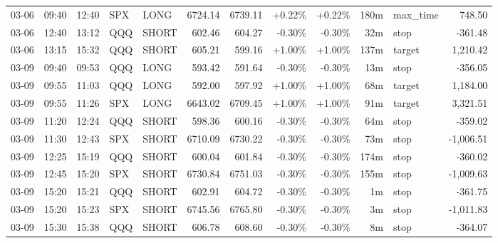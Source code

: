 \documentclass[11pt,a4paper,twoside]{article}
\begin{document}
\begin{center}
\begin{longtable}{>{\color{txtmain}}l l l l l r r r r r >{\color{txtmain}}l r}
03-06 & 09:40 & 12:40 & SPX & LONG & 6724.14 & 6739.11 & \textcolor{wingreen}{+0.22\%} & \textcolor{wingreen}{+0.22\%} & 180m & max\_time & \textcolor{wingreen}{748.50} \\
03-06 & 12:40 & 13:12 & QQQ & SHORT & 602.46 & 604.27 & \textcolor{lossred}{-0.30\%} & \textcolor{lossred}{-0.30\%} & 32m & stop & \textcolor{lossred}{-361.48} \\
03-06 & 13:15 & 15:32 & QQQ & SHORT & 605.21 & 599.16 & \textcolor{wingreen}{+1.00\%} & \textcolor{wingreen}{+1.00\%} & 137m & target & \textcolor{wingreen}{1,210.42} \\
03-09 & 09:40 & 09:53 & QQQ & LONG & 593.42 & 591.64 & \textcolor{lossred}{-0.30\%} & \textcolor{lossred}{-0.30\%} & 13m & stop & \textcolor{lossred}{-356.05} \\
03-09 & 09:55 & 11:03 & QQQ & LONG & 592.00 & 597.92 & \textcolor{wingreen}{+1.00\%} & \textcolor{wingreen}{+1.00\%} & 68m & target & \textcolor{wingreen}{1,184.00} \\
03-09 & 09:55 & 11:26 & SPX & LONG & 6643.02 & 6709.45 & \textcolor{wingreen}{+1.00\%} & \textcolor{wingreen}{+1.00\%} & 91m & target & \textcolor{wingreen}{3,321.51} \\
03-09 & 11:20 & 12:24 & QQQ & SHORT & 598.36 & 600.16 & \textcolor{lossred}{-0.30\%} & \textcolor{lossred}{-0.30\%} & 64m & stop & \textcolor{lossred}{-359.02} \\
03-09 & 11:30 & 12:43 & SPX & SHORT & 6710.09 & 6730.22 & \textcolor{lossred}{-0.30\%} & \textcolor{lossred}{-0.30\%} & 73m & stop & \textcolor{lossred}{-1,006.51} \\
03-09 & 12:25 & 15:19 & QQQ & SHORT & 600.04 & 601.84 & \textcolor{lossred}{-0.30\%} & \textcolor{lossred}{-0.30\%} & 174m & stop & \textcolor{lossred}{-360.02} \\
03-09 & 12:45 & 15:20 & SPX & SHORT & 6730.84 & 6751.03 & \textcolor{lossred}{-0.30\%} & \textcolor{lossred}{-0.30\%} & 155m & stop & \textcolor{lossred}{-1,009.63} \\
03-09 & 15:20 & 15:21 & QQQ & SHORT & 602.91 & 604.72 & \textcolor{lossred}{-0.30\%} & \textcolor{lossred}{-0.30\%} & 1m & stop & \textcolor{lossred}{-361.75} \\
03-09 & 15:20 & 15:23 & SPX & SHORT & 6745.56 & 6765.80 & \textcolor{lossred}{-0.30\%} & \textcolor{lossred}{-0.30\%} & 3m & stop & \textcolor{lossred}{-1,011.83} \\
03-09 & 15:30 & 15:38 & QQQ & SHORT & 606.78 & 608.60 & \textcolor{lossred}{-0.30\%} & \textcolor{lossred}{-0.30\%} & 8m & stop & \textcolor{lossred}{-364.07} \\

\end{longtable}
\end{center}
\end{document}
